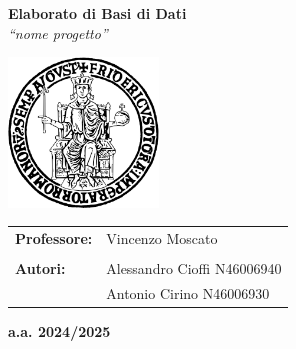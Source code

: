 \begin{titlepage}
    \begin{center}
        \Large
        \textbf{Elaborato di Basi di Dati} \\
        \vspace{0.5cm}
        \Huge
        \textit{``nome progetto''} \\
    
        \vspace{2cm}
    
        \includegraphics[width=0.3\textwidth]{Media/logo_unina.png} \\ 
    
        \vspace{2cm}
    
        \Large
        \begin{tabular}{l l}
            \textbf{Professore:} & Vincenzo Moscato \\\\
            \textbf{Autori:} & Alessandro Cioffi \hfill N46006940 \\
                             & Antonio Cirino \hfill N46006930 \\
        \end{tabular}
    
        \vfill
    
        \textbf{a.a. 2024/2025}
    \end{center}
\end{titlepage}

